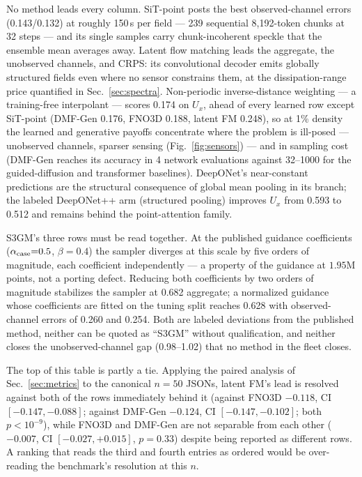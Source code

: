 \documentclass[aip,pof,reprint,amsmath,amssymb,superscriptaddress]{revtex4-1}
\newcommand{\dmfgen}{DMF-Gen}
\begin{document}
No method leads every column. SiT-point posts the
best observed-channel errors (0.143/0.132) at roughly 150\,s per field ---
239 sequential 8{,}192-token chunks at 32 steps --- and its single samples
carry chunk-incoherent speckle that the ensemble mean averages away. Latent
flow matching leads the aggregate, the unobserved channels, and CRPS: its
convolutional decoder emits globally structured fields even where no sensor
constrains them, at the dissipation-range price quantified in
Sec.~\ref{sec:spectra}. Non-periodic inverse-distance weighting --- a
training-free interpolant --- scores 0.174 on $U_x$, ahead of every learned
row except SiT-point (\dmfgen{} 0.176, FNO3D 0.188, latent FM 0.248), so at
1\% density the learned and generative payoffs concentrate where the problem
is ill-posed --- unobserved channels, sparser sensing
(Fig.~\ref{fig:sensors}) --- and in sampling cost (\dmfgen{} reaches its accuracy in
4 network evaluations against 32--1000 for the guided-diffusion and
transformer baselines).
DeepONet's near-constant predictions are the structural consequence of global
mean pooling in its branch; the labeled DeepONet++ arm (structured pooling)
improves $U_x$ from 0.593 to 0.512 and remains behind the point-attention
family.

S3GM's three rows must be read together. At the published guidance
coefficients ($\alpha_{\rm case}{=}0.5$, $\beta{=}0.4$) the sampler diverges
at this scale by five orders of magnitude, each coefficient independently ---
a property of the guidance at $1.95$M points, not a porting defect. Reducing
both coefficients by two orders of magnitude stabilizes the sampler at 0.682
aggregate; a normalized guidance whose coefficients are fitted on the tuning
split reaches 0.628 with observed-channel errors of 0.260 and 0.254. Both are
labeled deviations from the published method, neither can be quoted as
``S3GM'' without qualification, and neither closes the unobserved-channel gap
(0.98--1.02) that no method in the fleet closes.

The top of this table is partly a tie. Applying the paired analysis of
Sec.~\ref{sec:metrics} to the canonical $n{=}50$ JSONs, latent FM's lead is
resolved against both of the rows immediately behind it (against FNO3D
$-0.118$, CI $[-0.147,-0.088]$; against \dmfgen{} $-0.124$, CI
$[-0.147,-0.102]$; both $p<10^{-9}$), while FNO3D and \dmfgen{} are not
separable from each other ($-0.007$, CI $[-0.027,+0.015]$, $p=0.33$) despite
being reported as different rows. A ranking that reads the third and fourth
entries as ordered would be over-reading the benchmark's resolution at this
$n$.
\end{document}
